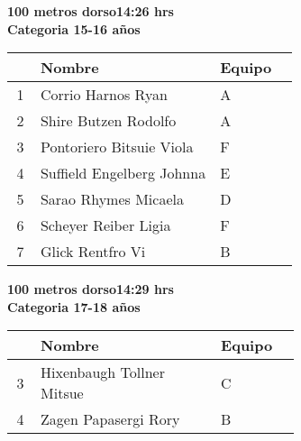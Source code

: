 \begin{minipage}{0.95\linewidth}\vspace{0.5cm} 
\begin{flushleft}
\textbf{
\hspace{-0.15cm}100 metros dorso\hspace{1.5cm}14:26 hrs \\Categoria 15-16 años}\vspace{-0.2cm} 
\end{flushleft}
\begin{tabular}{cp{0.63\linewidth}l}
\hline
& \textbf{Nombre} & \textbf{Equipo} \\ \hline
1 & Corrio Harnos Ryan & A \\ 
2 & Shire Butzen Rodolfo & A \\ 
3 & Pontoriero Bitsuie Viola & F \\ 
4 & Suffield Engelberg Johnna & E \\ 
5 & Sarao Rhymes Micaela & D \\ 
6 & Scheyer Reiber Ligia & F \\ 
7 & Glick Rentfro Vi & B \\ 
\end{tabular}
\end{minipage}
\begin{minipage}{0.95\linewidth}\vspace{0.5cm} 
\begin{flushleft}
\textbf{
\hspace{-0.15cm}100 metros dorso\hspace{1.5cm}14:29 hrs \\Categoria 17-18 años}\vspace{-0.2cm} 
\end{flushleft}
\begin{tabular}{cp{0.63\linewidth}l}
\hline
& \textbf{Nombre} & \textbf{Equipo} \\ \hline
3 & Hixenbaugh Tollner Mitsue & C \\ 
4 & Zagen Papasergi Rory & B \\ 
\end{tabular}
\end{minipage}
